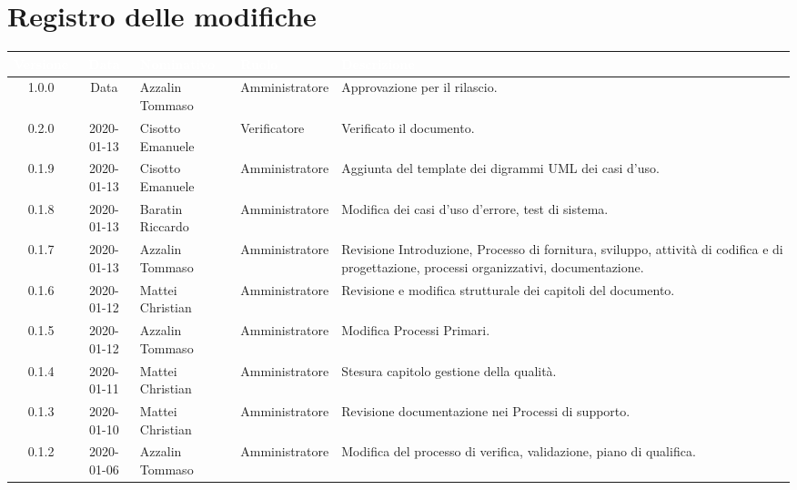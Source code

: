 \section*{Registro delle modifiche}
{
\renewcommand{\arraystretch}{1.5}
\centering
\begin{longtable}{c c  C{4cm}  C{3cm} C{4cm}}
\textcolor{white}{\textbf{Versione}} & \textcolor{white}{\textbf{Data}} & \textcolor{white}{\textbf{Nominativo}} & \textcolor{white}{\textbf{Ruolo}} & \textcolor{white}{\textbf{Descrizione}}\\	
\endhead


1.0.0 & Data & Azzalin Tommaso & Amministratore & Approvazione per il rilascio.  \\

0.2.0 & 2020-01-13 & Cisotto Emanuele & Verificatore & Verificato il documento. \\

0.1.9 & 2020-01-13 & Cisotto Emanuele & Amministratore & Aggiunta del template dei digrammi UML dei casi d'uso. \\

0.1.8 & 2020-01-13 & Baratin Riccardo & Amministratore & Modifica dei casi d'uso d'errore, test di sistema. \\

0.1.7 & 2020-01-13 & Azzalin Tommaso & Amministratore & Revisione Introduzione, Processo di fornitura, sviluppo, attività di codifica e di progettazione, processi organizzativi, documentazione. \\

0.1.6 & 2020-01-12 & Mattei Christian & Amministratore & Revisione e modifica strutturale dei capitoli del documento. \\

0.1.5 & 2020-01-12 & Azzalin Tommaso & Amministratore & Modifica Processi Primari. \\

0.1.4 & 2020-01-11 & Mattei Christian & Amministratore & Stesura capitolo gestione della qualità. \\

0.1.3 & 2020-01-10 & Mattei Christian & Amministratore & Revisione documentazione nei Processi di supporto. \\

0.1.2 & 2020-01-06 & Azzalin Tommaso & Amministratore & Modifica del processo di verifica, validazione, piano di qualifica. \\


\end{longtable}}
